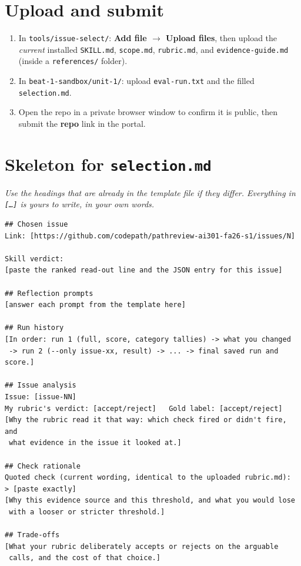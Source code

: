 \documentclass[11pt]{article}
\begin{document}
\section{Upload and submit}
\begin{enumerate}[label=\textbf{8.\arabic*}]
  \item In \texttt{tools/issue-select/}: \textbf{Add file $\rightarrow$ Upload files}, then upload the \emph{current} installed
        \texttt{SKILL.md}, \texttt{scope.md}, \texttt{rubric.md}, and \texttt{evidence-guide.md} (inside a \texttt{references/} folder).
  \item In \texttt{beat-1-sandbox/unit-1/}: upload \texttt{eval-run.txt} and the filled \texttt{selection.md}.
  \item Open the repo in a private browser window to confirm it is public, then submit the \textbf{repo} link in the portal.
\end{enumerate}

\newpage
\section*{Skeleton for \texttt{selection.md}}
\emph{Use the headings that are already in the template file if they differ. Everything in \texttt{[\ldots]} is yours to write, in your own words.}

\begin{lstlisting}
## Chosen issue
Link: [https://github.com/codepath/pathreview-ai301-fa26-s1/issues/N]

Skill verdict:
[paste the ranked read-out line and the JSON entry for this issue]

## Reflection prompts
[answer each prompt from the template here]

## Run history
[In order: run 1 (full, score, category tallies) -> what you changed
 -> run 2 (--only issue-xx, result) -> ... -> final saved run and score.]

## Issue analysis
Issue: [issue-NN]
My rubric's verdict: [accept/reject]   Gold label: [accept/reject]
[Why the rubric read it that way: which check fired or didn't fire, and
 what evidence in the issue it looked at.]

## Check rationale
Quoted check (current wording, identical to the uploaded rubric.md):
> [paste exactly]
[Why this evidence source and this threshold, and what you would lose
 with a looser or stricter threshold.]

## Trade-offs
[What your rubric deliberately accepts or rejects on the arguable
 calls, and the cost of that choice.]
\end{lstlisting}
\end{document}
